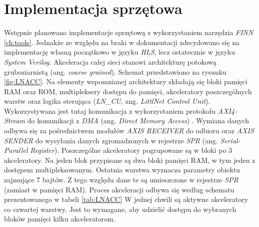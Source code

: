 \section{Implementacja sprzętowa}
Wstępnie planowano implementacje sprzętową z wykorzystaniem narzędzia \emph{FINN} \ref{ch:tools}.
Jednakże ze względu na braki w dokumentacji zdecydowano się na implementację własną początkowo w języku \emph{HLS}, lecz ostatecznie w języku \emph{System Verilog}.
Akceleracja całej sieci stanowi architekturę potokową gruboziarnistą (ang. \emph{coarse grained}).
Schemat przedstawiono na rysunku \ref{fig:LNACC}.
Na elementy wspomnianej architektury składają się bloki pamięci RAM oraz ROM, multipleksery dostępu do pamięci, akceleratory poszczególnych warstw oraz logika sterująca (\emph{LN\_CU}, ang. \emph{LittlNet Control Unit}).
Wykorzystywana jest tutaj komunikacja z wykorzystaniem protokołu \emph{AXI4-Stream} \cite{axis} do komunikacji z \emph{DMA} (ang. \emph{Direct Memory Access}) \cite{dma}.
Wymiana danych odbywa się za pośrednictwem  modułów \emph{AXIS RECEIVER} do odbioru oraz \emph{AXIS SENDER} do wysyłania danych zgromadzonych w rejestrze \emph{SPR} (ang. \emph{Serial-Parallel Register}).
Poszczególne akceleratory pogrupowane są w bloki po 3 akceleratory. 
Na jeden blok przypisane są dwa bloki pamięci RAM, w tym jeden z dostępem  multipleksowanym.
Ostatnia warstwa wyznacza parametry obiektu zajmujące 7 bajtów.
Z tego względu dane te są umieszczone w rejestrze \emph{SPR} (zamiast w pamięci RAM).
Proces akceleracji odbywa się według schematu prezentowanego w tabeli \ref{tab:LNACC}
W jednej chwili są aktywne akceleratory co czwartej warstwy.
Jest to wymagane, aby udzielić dostępu do wybranych bloków pamięci kilku akceleratorom.

